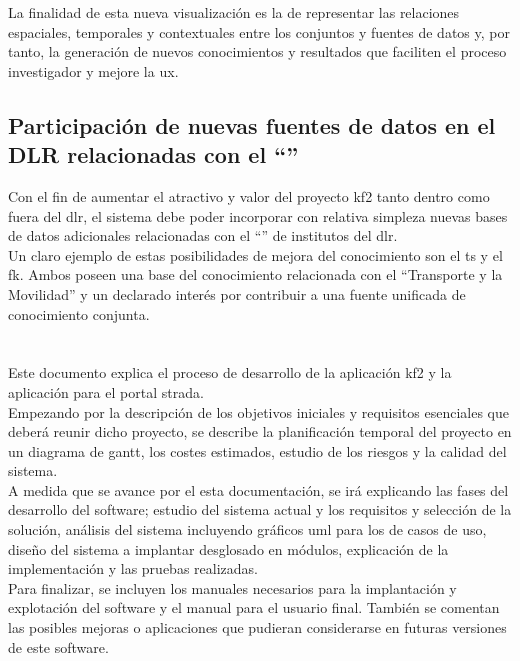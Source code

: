 La finalidad de esta nueva visualización es la de representar las relaciones espaciales, temporales y contextuales entre los conjuntos y fuentes de datos y, por tanto, la generación de nuevos conocimientos y resultados que faciliten el proceso investigador y mejore la \gls{ux}.


\subsection{Participación de nuevas fuentes de datos en el DLR relacionadas con  el ``\transmov''}

Con el fin de aumentar el atractivo y valor del proyecto \gls{kf2} tanto dentro como fuera del \gls{dlr}, el sistema debe poder incorporar con relativa simpleza nuevas bases de datos adicionales relacionadas con el ``\transmov'' de institutos del \gls{dlr}.\\

Un claro ejemplo de estas posibilidades de mejora del conocimiento son el \gls{ts} y el \gls{fk}. Ambos poseen una base del conocimiento relacionada con el ``Transporte y la Movilidad'' y un declarado interés por contribuir a una fuente unificada de conocimiento conjunta.\\


\section{} 

Este documento explica el proceso de desarrollo de la aplicación \gls{kf2} y la aplicación para el portal \gls{strada}.\\

Empezando por la descripción de los objetivos iniciales y requisitos esenciales que deberá reunir dicho proyecto, 
se describe la planificación temporal del proyecto en un diagrama de \gls{gantt}, los costes estimados, estudio de los riesgos y la calidad del sistema.\\

A medida que se avance por el esta documentación, se irá explicando las fases del desarrollo del software; estudio del sistema actual y los requisitos y selección de la solución, análisis del sistema incluyendo gráficos \gls{uml} para los de casos de uso, diseño del sistema a implantar desglosado en módulos, explicación de la implementación y las pruebas realizadas.\\

Para finalizar, se incluyen los manuales necesarios para la implantación y explotación del \gls{software} y el manual para el usuario final. También se comentan las posibles mejoras o aplicaciones que pudieran considerarse en futuras versiones de este \gls{software}.
